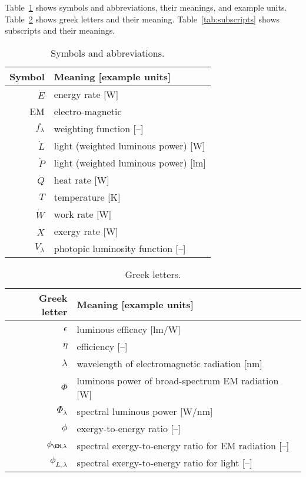 
\noindent 
Table~\ref{tab:symbols} shows symbols and abbreviations, their meanings, and example units.
Table~\ref{tab:greek} shows greek letters and their meaning.
Table~\ref{tab:subscripts} shows subscripts and their meanings.


  
\begin{table}
\centering %
\caption{Symbols and abbreviations.}
\begin{tabular}{r l}
\toprule
Symbol & Meaning [example units] \\
\midrule
$\dot{E}$ & energy rate [W] \\
EM & electro-magnetic \\
$f_\lambda$ & weighting function [--] \\
$\dot{L}$ & light (weighted luminous power) [W] \\
$\dot{P}$ & light (weighted luminous power) [lm] \\
$\dot{Q}$ & heat rate [W] \\
$T$ & temperature [K] \\
$\dot{W}$ & work rate [W] \\
$\dot{X}$ & exergy rate [W] \\
$V_\lambda$ & photopic luminosity function [--] \\
\bottomrule
\end{tabular}
\label{tab:symbols}
\end{table}



\begin{table}
\centering %
\caption{Greek letters.}
\begin{tabular}{r l}
  \toprule
  Greek letter & Meaning [example units] \\
  \midrule
  $\epsilon$ & luminous efficacy [lm/W] \\
  $\eta$ & efficiency [--] \\
  $\lambda$ & wavelength of electromagnetic radiation [nm] \\
  $\Phi$ & luminous power of broad-spectrum EM radiation [W] \\
  $\Phi_\lambda$ & spectral luminous power [W/nm] \\
  $\phi$ & exergy-to-energy ratio [--] \\
  $\phi_{\EM,\lambda}$ & spectral exergy-to-energy ratio for EM radiation [--] \\
  $\phi_{L,\lambda}$ & spectral exergy-to-energy ratio for light [--] \\
  \bottomrule
\end{tabular}
\label{tab:greek}
\end{table}


